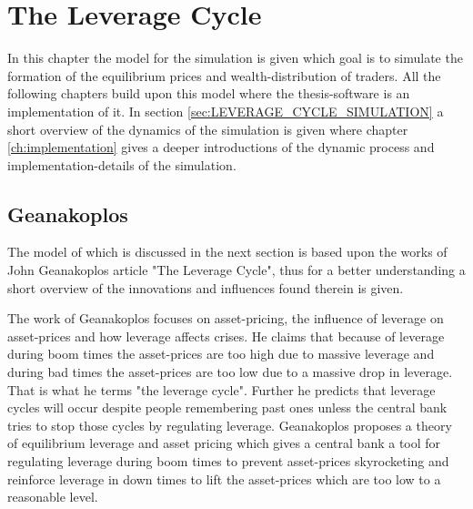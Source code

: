 \documentclass[../Bachelorarbeit.tex]{subfiles}
\begin{document}
\chapter{The Leverage Cycle}
\label{ch:leverageCycle}

In this chapter the model for the simulation is given which goal is to simulate the formation of the equilibrium prices and wealth-distribution of traders. All the following chapters build upon this model where the thesis-software is an implementation of it. In section \ref{sec:LEVERAGE_CYCLE_SIMULATION} a short overview of the dynamics of the simulation is given where chapter \ref{ch:implementation} gives a deeper introductions of the dynamic process and implementation-details of the simulation.

\section{Geanakoplos}
The model of \cite{Breuer2015} which is discussed in the next section is based upon the works of John Geanakoplos article \cite{Geanakoplos2009} "The Leverage Cycle", thus for a better understanding a short overview of the innovations and influences found therein is given.

\medskip

The work of Geanakoplos focuses on asset-pricing, the influence of leverage on asset-prices and how leverage affects crises. He claims that because of leverage during boom times the asset-prices are too high due to massive leverage and during bad times the asset-prices are too low due to a massive drop in leverage. That is what he terms "the leverage cycle". Further he predicts that leverage cycles will occur despite people remembering past ones unless the central bank tries to stop those cycles by regulating leverage. Geanakoplos proposes a theory of equilibrium leverage and asset pricing which gives a central bank a tool for regulating leverage during boom times to prevent asset-prices skyrocketing and reinforce leverage in down times to lift the asset-prices which are too low to a reasonable level.
\end{document}
